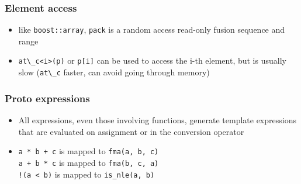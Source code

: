 \documentclass{beamer}
\begin{document}
\begin{frame}
	\frametitle{Element access}
	
	\begin{itemize}
		\item like \lstinline{boost::array}, \lstinline{pack} is a random access read-only fusion sequence and range
		\item \lstinline{at\_c<i>(p)} or \lstinline{p[i]} can be used to access the i-th element, but is usually slow (\lstinline{at\_c} faster, can avoid going through memory)
	\end{itemize}
	
\end{frame}

\begin{frame}
	\frametitle{Proto expressions}
	
	\begin{itemize}
		\item All expressions, even those involving functions,
		      generate template expressions that are evaluated on assignment
		      or in the conversion operator
		\item \lstinline{a * b + c} is mapped to \lstinline{fma(a, b, c)}\\
		      \lstinline{a + b * c} is mapped to \lstinline{fma(b, c, a)}\\
		      \lstinline{!(a < b)} is mapped to \lstinline{is_nle(a, b)}
	\end{itemize}
	
\end{frame}
\end{document}
